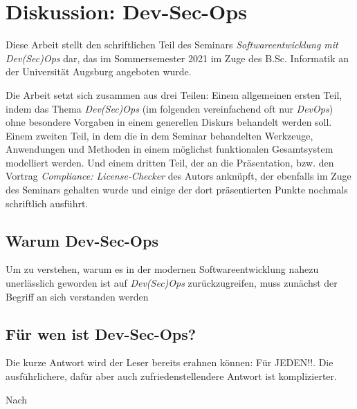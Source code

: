 \chapter{Diskussion: Dev-Sec-Ops}

Diese Arbeit stellt den schriftlichen Teil des Seminars \emph{Softwareentwicklung mit Dev(Sec)Ops} dar, das im Sommersemester 2021 im Zuge des B.Sc. Informatik an der Universität Augsburg angeboten wurde.

Die Arbeit setzt sich zusammen aus drei Teilen: Einem allgemeinen ersten Teil, indem das Thema \emph{Dev(Sec)Ops} (im folgenden vereinfachend oft nur \emph{DevOps}) ohne besondere Vorgaben in einem generellen Diskurs behandelt werden soll. Einem zweiten Teil, in dem die in dem Seminar behandelten Werkzeuge, Anwendungen und Methoden in einem möglichst funktionalen Gesamtsystem modelliert werden. Und einem dritten Teil, der an die Präsentation, bzw. den Vortrag \emph{Compliance: License-Checker} des Autors anknüpft, der ebenfalls im Zuge des Seminars gehalten wurde und einige der dort präsentierten Punkte nochmals schriftlich ausführt.

\section{Warum Dev-Sec-Ops}

Um zu verstehen, warum es in der modernen Softwareentwicklung nahezu unerlässlich geworden ist auf \emph{Dev(Sec)Ops} zurückzugreifen, muss zunächst der Begriff an sich verstanden werden \cite{forcepointWhatDevSecOpsDefined} \cite{redheadWasIstDevSecOps}


\section{Für wen ist Dev-Sec-Ops?}

Die kurze Antwort wird der Leser bereits erahnen können: \glqq Für JEDEN!!\grqq{}. Die ausführlichere, dafür aber auch zufriedenstellendere Antwort ist komplizierter. 

Nach 